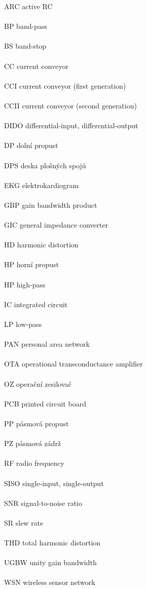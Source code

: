 \vspace*{0.5cm}
ARC \hfill active RC \\ \\
BP \hfill band-pass \\ \\
BS \hfill band-stop \\ \\
CC \hfill current conveyor \\ \\
CCI \hfill current conveyor (first generation) \\ \\
CCII \hfill current conveyor (second generation) \\ \\
DIDO \hfill differential-input, differential-output \\ \\
DP \hfill dolní propust \\ \\
DPS \hfill deska plošných spojů \\ \\
EKG \hfill elektrokardiogram \\ \\
GBP \hfill gain bandwidth product \\ \\
GIC \hfill general impedance converter \\ \\
HD \hfill harmonic distortion \\ \\
HP \hfill horní propust \\ \\
HP \hfill high-pass \\ \\
IC \hfill integrated circuit \\ \\
LP \hfill low-pass \\ \\
PAN \hfill personal area network \\ \\
OTA \hfill operational transconductance amplifier \\ \\
OZ \hfill operační zesilovač \\ \\
PCB \hfill printed circuit board \\ \\
PP \hfill pásmová propust \\ \\
PZ \hfill pásmová zádrž \\ \\
RF \hfill radio frequency \\ \\
SISO \hfill single-input, single-output \\ \\
SNR \hfill signal-to-noise ratio \\ \\
SR \hfill slew rate \\ \\
THD \hfill total harmonic distortion \\ \\
UGBW \hfill unity gain bandwidth \\ \\
WSN \hfill wireless sensor network \\ \\